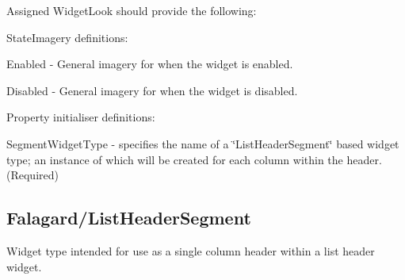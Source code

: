 Assigned Widget\+Look should provide the following\+: 
\begin{DoxyItemize}
\item State\+Imagery definitions\+: 
\begin{DoxyItemize}
\item Enabled -\/ General imagery for when the widget is enabled. 
\item Disabled -\/ General imagery for when the widget is disabled. 
\end{DoxyItemize}


\item Property initialiser definitions\+: 
\begin{DoxyItemize}
\item Segment\+Widget\+Type -\/ specifies the name of a \char`\"{}\+List\+Header\+Segment\char`\"{} based widget type; an instance of which will be created for each column within the header. (Required) 
\end{DoxyItemize}
\end{DoxyItemize}\hypertarget{fal_wr_ref_fal_wr_ref_sec_9}{}\subsection{Falagard/\+List\+Header\+Segment}\label{fal_wr_ref_fal_wr_ref_sec_9}
Widget type intended for use as a single column header within a list header widget.

